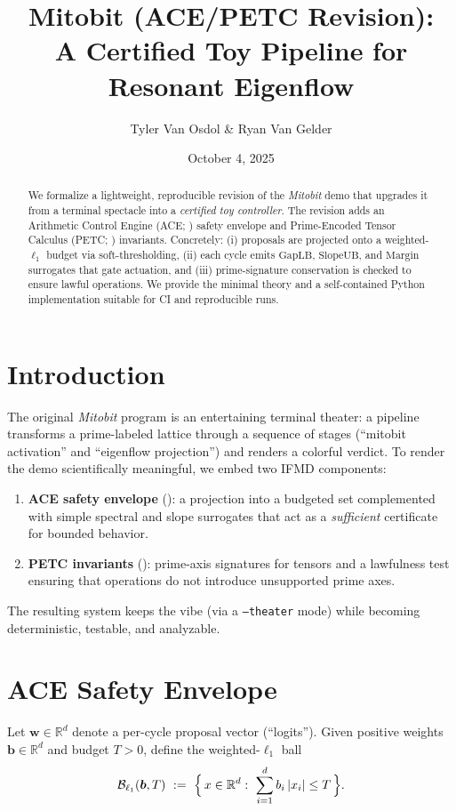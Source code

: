 \documentclass[11pt]{article}
\title{Mitobit (ACE/PETC Revision):\\A Certified Toy Pipeline for Resonant Eigenflow}
\author{Tyler Van Osdol \& Ryan Van Gelder}
\date{October 4, 2025}
\DeclarePairedDelimiter{\abs}{\lvert}{\rvert}
\newcommand{\w}{\bm{w}}
\newcommand{\bb}{\bm{b}}
\newcommand{\Tbudget}{T}
\newcommand{\GapLB}{\mathrm{GapLB}}
\newcommand{\SlopeUB}{\mathrm{SlopeUB}}
\newcommand{\Margin}{\mathrm{Margin}}
\begin{document}
\maketitle

\begin{abstract}
We formalize a lightweight, reproducible revision of the \emph{Mitobit} demo that upgrades it from a terminal spectacle into a \emph{certified toy controller}. The revision adds an Arithmetic Control Engine (ACE; \cite{ACE}) safety envelope and Prime-Encoded Tensor Calculus (PETC; \cite{PETC}) invariants. Concretely: (i) proposals are projected onto a weighted-$\ell_1$ budget via soft-thresholding, (ii) each cycle emits \(\GapLB\), \(\SlopeUB\), and \(\Margin\) surrogates that gate actuation, and (iii) prime-signature conservation is checked to ensure lawful operations. We provide the minimal theory and a self-contained Python implementation suitable for CI and reproducible runs.
\end{abstract}

\section{Introduction}
\label{sec:intro}
The original \emph{Mitobit} program is an entertaining terminal theater: a pipeline transforms a prime-labeled lattice through a sequence of stages (``mitobit activation'' and ``eigenflow projection'') and renders a colorful verdict. To render the demo scientifically meaningful, we embed two IFMD components:
\begin{enumerate}[leftmargin=2.2em]
  \item \textbf{ACE safety envelope} (\cite{ACE}): a projection into a budgeted set complemented with simple spectral and slope surrogates that act as a \emph{sufficient} certificate for bounded behavior.
  \item \textbf{PETC invariants} (\cite{PETC}): prime-axis signatures for tensors and a lawfulness test ensuring that operations do not introduce unsupported prime axes.
\end{enumerate}
The resulting system keeps the vibe (via a \texttt{--theater} mode) while becoming deterministic, testable, and analyzable.

\section{ACE Safety Envelope}
\label{sec:ace}
Let $\w\in\mathbb{R}^d$ denote a per-cycle proposal vector (``logits''). Given positive weights $\bb\in\mathbb{R}^d$ and budget $\Tbudget>0$, define the weighted-$\ell_1$ ball
\begin{equation}
\mathcal{B}_{\ell_1}(\bb,\Tbudget)~:=~\Big\{\,x\in\mathbb{R}^d:~\sum_{i=1}^d b_i\,\abs{x_i}\le \Tbudget\,\Big\}.
\end{equation}
\end{document}
